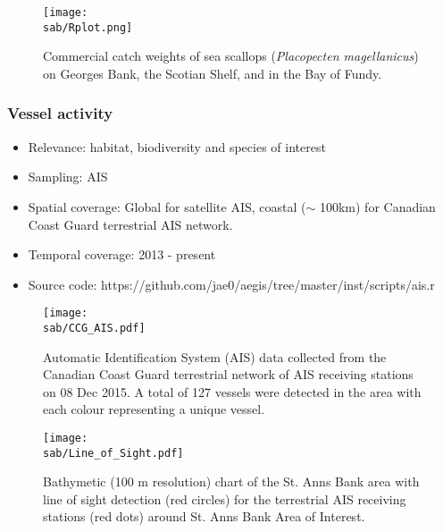 \documentclass{beamer}
\numberwithin{figure}{section}		%
\numberwithin{table}{section}				%
\newcommand{\D}{.}
\newcommand{\bd}{\string~/bio\D data}   %
\newcommand{\sab}{\bd/mpa/sab}   %
\begin{document}

\begin{frame}[shrink]
\begin{figure}[h]
	\centering
 \texttt{[image: \\sab/Rplot.png]}
	\caption{Commercial catch weights of sea scallops (\textit{Placopecten magellanicus}) on Georges Bank, the Scotian Shelf, and in the Bay of Fundy.}
		\label{fig:Scallop}
\end{figure}
\end{frame}




\begin{frame}[shrink]
\frametitle{Vessel activity}
\begin{itemize}
	\item Relevance:  habitat, biodiversity and species of interest
	\item Sampling:  AIS
	\item Spatial coverage: Global for satellite AIS, coastal ($\sim$ 100km) for Canadian Coast Guard terrestrial AIS network.
	\item Temporal coverage: 2013 - present
	\item Source code: https://github.com/jae0/aegis/tree/master/inst/scripts/ais.r
\end{itemize}
\end{frame}



\begin{frame}[shrink]

\begin{figure}[h]
  \centering
	\texttt{[image: \\sab/CCG\_AIS.pdf]}
	\caption{Automatic Identification System (AIS) data collected from the Canadian Coast Guard terrestrial network of AIS receiving stations on 08 Dec 2015. A total of 127 vessels were detected in the area with each colour representing a unique vessel.}
    \label{fig:TAIS}
\end{figure}


\end{frame}




\begin{frame}[shrink]

\begin{figure}[h]
	\centering
	\texttt{[image: \\sab/Line\_of\_Sight.pdf]}
	\caption{Bathymetic (100 m resolution) chart of the  St. Anns Bank area with line of sight detection (red circles) for the terrestrial AIS receiving stations (red dots) around St. Anns Bank Area of Interest.}
   \label{fig:LOF}
\end{figure}

\end{frame}
\end{document}
